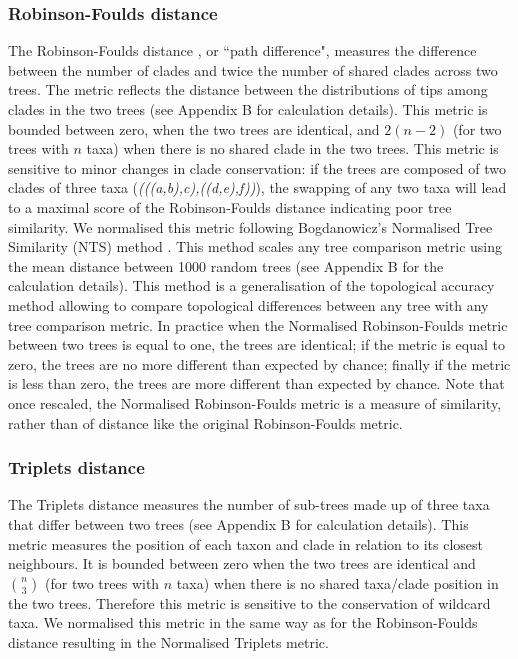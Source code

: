 \documentclass[12pt,letterpaper]{article}
\begin{document}
\subsubsection{Robinson-Foulds distance}
The Robinson-Foulds distance \citep{RF1981}, or ``path difference", measures the difference between the number of clades and twice the number of shared clades across two trees.
The metric reflects the distance between the distributions of tips among clades in the two trees \citep{RF1981} (see Appendix B for calculation details).
This metric is bounded between zero, when the two trees are identical, and $2(n-2)$ (for two trees with $n$ taxa) when there is no shared clade in the two trees.
This metric is sensitive to minor changes in clade conservation: if the trees are composed of two clades of three taxa (\textit{(((a,b),c),((d,e),f))}), the swapping of any two taxa will lead to a maximal score of the Robinson-Foulds distance indicating poor tree similarity.
We normalised this metric following Bogdanowicz's Normalised Tree Similarity (NTS) method \citep{Bogdanowicz2012}.
This method scales any tree comparison metric using the mean distance between 1000 random trees (see Appendix B for the calculation details).
This method is a generalisation of the topological accuracy method \citep{Price2010} allowing to compare topological differences between any tree with any tree comparison metric.
In practice when the Normalised Robinson-Foulds metric between two trees is equal to one, the trees are identical; if the metric is equal to zero, the trees are no more different than expected by chance; finally if the metric is less than zero, the trees are more different than expected by chance.
Note that once rescaled, the Normalised Robinson-Foulds metric is a measure of similarity, rather than of distance like the original Robinson-Foulds metric. 

\subsubsection{Triplets distance}
The Triplets distance \citep{dobson1975triplets} measures the number of sub-trees made up of three taxa that differ between two trees \citep{critchlowthe1996} (see Appendix B for calculation details).
This metric measures the position of each taxon and clade in relation to its closest neighbours.
It is bounded between zero when the two trees are identical and $\binom{n}{3}$ (for two trees with $n$ taxa) when there is no shared taxa/clade position in the two trees.
Therefore this metric is sensitive to the conservation of wildcard taxa.
We normalised this metric in the same way as for the Robinson-Foulds distance resulting in the Normalised Triplets metric.
\end{document}
